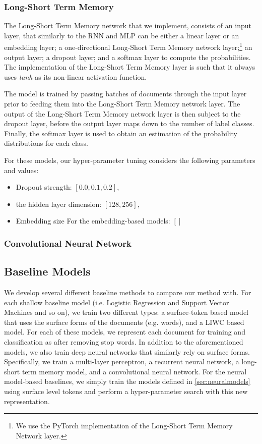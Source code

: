 \subsubsection{Long-Short Term Memory}

The Long-Short Term Memory network that we implement, consists of an input layer, that similarly to the RNN and MLP can be either a linear layer or an embedding layer; a one-directional Long-Short Term Memory network layer;\footnote{We use the PyTorch implementation of the Long-Short Term Memory Network layer.} an output layer; a dropout layer; and a softmax layer to compute the probabilities. The implementation of the Long-Short Term Memory layer is such that it always uses \textit{tanh} as its non-linear activation function.

The model is trained by passing batches of documents through the input layer prior to feeding them into the Long-Short Term Memory network layer. The output of the Long-Short Term Memory network layer is then subject to the dropout layer, before the output layer maps down to the number of label classes. Finally, the softmax layer is used to obtain an estimation of the probability distributions for each class.

For these models, our hyper-parameter tuning considers the following parameters and values:

\begin{itemize}
  \item Dropout strength: $[0.0, 0.1, 0.2]$, 
  \item the hidden layer dimension: $[128, 256]$,
  \item Embedding size  For the embedding-based models: $[]$
\end{itemize}

\subsubsection{Convolutional Neural Network}


\subsection{Baseline Models}

We develop several different baseline methods to compare our method with. For each shallow baseline model (i.e. Logistic Regression and Support Vector Machines and so on), we train two different types: a surface-token based model that uses the surface forms of the documents (e.g. words), and a LIWC based model. For each of these models, we represent each document for training and classification as  after removing stop words. In addition to the aforementioned models, we also train deep neural networks that similarly rely on surface forms. Specifically, we train a multi-layer perceptron, a recurrent neural network, a long-short term memory model, and a convolutional neural network. For the neural model-based baselines, we simply train the models defined in \autoref{sec:neuralmodels} using surface level tokens and perform a hyper-parameter search with this new representation.

